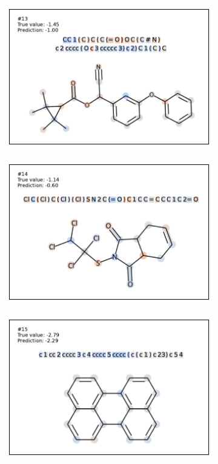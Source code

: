 \begin{figure}
\begin{subfigure}[b]{0.33\textwidth}
\end{subfigure}
\begin{subfigure}[b]{0.33\textwidth} 
  \centering 
  \includegraphics[width=\textwidth]{figures/esol/esol13.pdf} 
\end{subfigure}\begin{subfigure}[b]{0.33\textwidth} 
  \centering 
  \includegraphics[width=\textwidth]{figures/esol/esol14.pdf} 
\end{subfigure}\begin{subfigure}[b]{0.33\textwidth} 
  \centering 
  \includegraphics[width=\textwidth]{figures/esol/esol15.pdf} 

\end{subfigure}
\end{figure}

